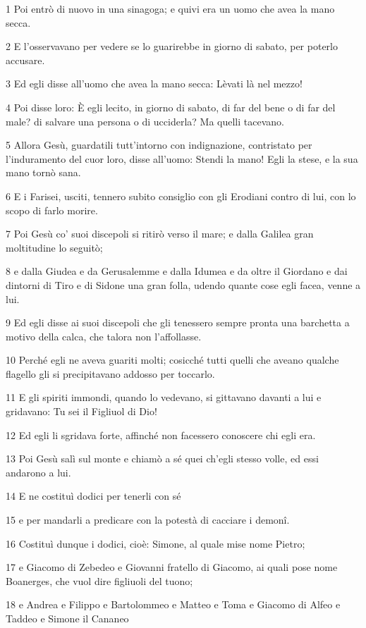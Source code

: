 \par 1 Poi entrò di nuovo in una sinagoga; e quivi era un uomo che avea la mano secca.
\par 2 E l'osservavano per vedere se lo guarirebbe in giorno di sabato, per poterlo accusare.
\par 3 Ed egli disse all'uomo che avea la mano secca: Lèvati là nel mezzo!
\par 4 Poi disse loro: È egli lecito, in giorno di sabato, di far del bene o di far del male? di salvare una persona o di ucciderla? Ma quelli tacevano.
\par 5 Allora Gesù, guardatili tutt'intorno con indignazione, contristato per l'induramento del cuor loro, disse all'uomo: Stendi la mano! Egli la stese, e la sua mano tornò sana.
\par 6 E i Farisei, usciti, tennero subito consiglio con gli Erodiani contro di lui, con lo scopo di farlo morire.
\par 7 Poi Gesù co' suoi discepoli si ritirò verso il mare; e dalla Galilea gran moltitudine lo seguitò;
\par 8 e dalla Giudea e da Gerusalemme e dalla Idumea e da oltre il Giordano e dai dintorni di Tiro e di Sidone una gran folla, udendo quante cose egli facea, venne a lui.
\par 9 Ed egli disse ai suoi discepoli che gli tenessero sempre pronta una barchetta a motivo della calca, che talora non l'affollasse.
\par 10 Perché egli ne aveva guariti molti; cosicché tutti quelli che aveano qualche flagello gli si precipitavano addosso per toccarlo.
\par 11 E gli spiriti immondi, quando lo vedevano, si gittavano davanti a lui e gridavano: Tu sei il Figliuol di Dio!
\par 12 Ed egli li sgridava forte, affinché non facessero conoscere chi egli era.
\par 13 Poi Gesù salì sul monte e chiamò a sé quei ch'egli stesso volle, ed essi andarono a lui.
\par 14 E ne costituì dodici per tenerli con sé
\par 15 e per mandarli a predicare con la potestà di cacciare i demonî.
\par 16 Costituì dunque i dodici, cioè: Simone, al quale mise nome Pietro;
\par 17 e Giacomo di Zebedeo e Giovanni fratello di Giacomo, ai quali pose nome Boanerges, che vuol dire figliuoli del tuono;
\par 18 e Andrea e Filippo e Bartolommeo e Matteo e Toma e Giacomo di Alfeo e Taddeo e Simone il Cananeo
